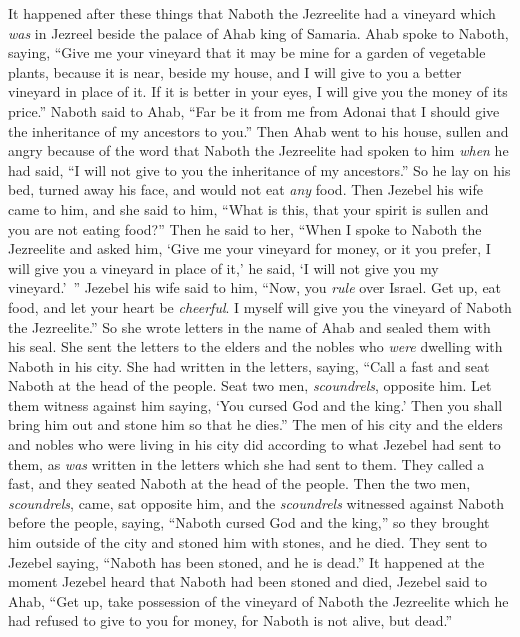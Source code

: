\begin{biblechapter} %
 It happened after these things that Naboth the Jezreelite had a vineyard which \textit{was} in Jezreel beside the palace of Ahab king of Samaria.
\verse Ahab spoke to Naboth, saying, “Give me your vineyard that it may be mine for a garden of vegetable plants, because it is near, beside my house, and I will give to you a better vineyard in place of it. If it is better in your eyes, I will give you the money of its price.”
\verse Naboth said to Ahab, “Far be it from me from Adonai that I should give the inheritance of my ancestors to you.”
\verse Then Ahab went to his house, sullen and angry because of the word that Naboth the Jezreelite had spoken to him \textit{when} he had said, “I will not give to you the inheritance of my ancestors.” So he lay on his bed, turned away his face, and would not eat \textit{any} food.
\verse Then Jezebel his wife came to him, and she said to him, “What is this, that your spirit is sullen and you are not eating food?”
\verse Then he said to her, “When I spoke to Naboth the Jezreelite and asked him, ‘Give me your vineyard for money, or it you prefer, I will give you a vineyard in place of it,’ he said, ‘I will not give you my vineyard.’ ”
\verse Jezebel his wife said to him, “Now, you \textit{rule} over Israel. Get up, eat food, and let your heart be \textit{cheerful}. I myself will give you the vineyard of Naboth the Jezreelite.”
\verse So she wrote letters in the name of Ahab and sealed them with his seal. She sent the letters to the elders and the nobles who \textit{were} dwelling with Naboth in his city.
\verse She had written in the letters, saying, “Call a fast and seat Naboth at the head of the people.
\verse Seat two men, \textit{scoundrels}, opposite him. Let them witness against him saying, ‘You cursed God and the king.’ Then you shall bring him out and stone him so that he dies.”
\verse The men of his city and the elders and nobles who were living in his city did according to what Jezebel had sent to them, as \textit{was} written in the letters which she had sent to them.
\verse They called a fast, and they seated Naboth at the head of the people.
\verse Then the two men, \textit{scoundrels}, came, sat opposite him, and the \textit{scoundrels} witnessed against Naboth before the people, saying, “Naboth cursed God and the king,” so they brought him outside of the city and stoned him with stones, and he died.
\verse They sent to Jezebel saying, “Naboth has been stoned, and he is dead.”
\verse It happened at the moment Jezebel heard that Naboth had been stoned and died, Jezebel said to Ahab, “Get up, take possession of the vineyard of Naboth the Jezreelite which he had refused to give to you for money, for Naboth is not alive, but dead.”

\end{biblechapter}
